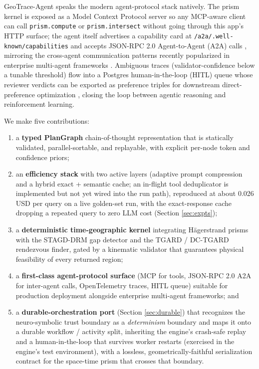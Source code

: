 \documentclass{article}
\begin{document}
\smallskip
GeoTrace-Agent speaks the modern agent-protocol stack natively. The prism kernel is exposed as a Model Context Protocol \citep{anthropic2024mcp} server so any MCP-aware client can call \texttt{prism.compute} or \texttt{prism.intersect} without going through this app's HTTP surface; the agent itself advertises a capability card at \texttt{/a2a/.well-known/capabilities} and accepts JSON-RPC 2.0 Agent-to-Agent (A2A) calls \citep{google2024a2a}, mirroring the cross-agent communication patterns recently popularized in enterprise multi-agent frameworks \citep{centific2025legalwiz, centific2025contragen, centific2025art}. Ambiguous traces (validator-confidence below a tunable threshold) flow into a Postgres human-in-the-loop (HITL) queue whose reviewer verdicts can be exported as preference triples for downstream direct-preference optimization \citep{rafailov2023dpo}, closing the loop between agentic reasoning and reinforcement learning.

\smallskip
We make five contributions:
\begin{enumerate}[leftmargin=*]
  \item a \textbf{typed PlanGraph} chain-of-thought representation that is statically validated, parallel-sortable, and replayable, with explicit per-node token and confidence priors;
  \item an \textbf{efficiency stack} with two active layers (adaptive prompt compression and a hybrid exact + semantic cache; an in-flight tool deduplicator is implemented but not yet wired into the run path), reproduced at about 0.026 USD per query on a live golden-set run, with the exact-response cache dropping a repeated query to zero LLM cost (Section \ref{sec:expts});
  \item a \textbf{deterministic time-geographic kernel} integrating Hägerstrand prisms with the STAGD-DRM gap detector and the TGARD / DC-TGARD rendezvous finder, gated by a kinematic validator that guarantees physical feasibility of every returned region;
  \item a \textbf{first-class agent-protocol surface} (MCP for tools, JSON-RPC 2.0 A2A for inter-agent calls, OpenTelemetry traces, HITL queue) suitable for production deployment alongside enterprise multi-agent frameworks; and
  \item a \textbf{durable-orchestration port} (Section \ref{sec:durable}) that recognizes the neuro-symbolic trust boundary as a \emph{determinism} boundary and maps it onto a durable workflow / activity split, inheriting the engine's crash-safe replay and a human-in-the-loop that survives worker restarts (exercised in the engine's test environment), with a lossless, geometrically-faithful serialization contract for the space-time prism that crosses that boundary.
\end{enumerate}
\end{document}
